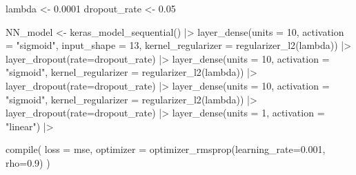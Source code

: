 \documentclass[
]{article}
\newenvironment{Shaded}{\begin{snugshade}}{\end{snugshade}}
\newcommand{\AttributeTok}[1]{\textcolor[rgb]{0.77,0.63,0.00}{#1}}
\newcommand{\DecValTok}[1]{\textcolor[rgb]{0.00,0.00,0.81}{#1}}
\newcommand{\FloatTok}[1]{\textcolor[rgb]{0.00,0.00,0.81}{#1}}
\newcommand{\FunctionTok}[1]{\textcolor[rgb]{0.00,0.00,0.00}{#1}}
\newcommand{\NormalTok}[1]{#1}
\newcommand{\OtherTok}[1]{\textcolor[rgb]{0.56,0.35,0.01}{#1}}
\newcommand{\SpecialCharTok}[1]{\textcolor[rgb]{0.00,0.00,0.00}{#1}}
\newcommand{\StringTok}[1]{\textcolor[rgb]{0.31,0.60,0.02}{#1}}
\begin{document}
\begin{Shaded}
\begin{Highlighting}[]
\NormalTok{lambda }\OtherTok{\textless{}{-}} \FloatTok{0.0001}
\NormalTok{dropout\_rate }\OtherTok{\textless{}{-}} \FloatTok{0.05}

\NormalTok{NN\_model }\OtherTok{\textless{}{-}} \FunctionTok{keras\_model\_sequential}\NormalTok{() }\SpecialCharTok{|\textgreater{}}
    \FunctionTok{layer\_dense}\NormalTok{(}\AttributeTok{units =} \DecValTok{10}\NormalTok{, }\AttributeTok{activation =} \StringTok{"sigmoid"}\NormalTok{, }\AttributeTok{input\_shape =} \DecValTok{13}\NormalTok{, }\AttributeTok{kernel\_regularizer =} \FunctionTok{regularizer\_l2}\NormalTok{(lambda)) }\SpecialCharTok{|\textgreater{}}
    \FunctionTok{layer\_dropout}\NormalTok{(}\AttributeTok{rate=}\NormalTok{dropout\_rate) }\SpecialCharTok{|\textgreater{}}
    \FunctionTok{layer\_dense}\NormalTok{(}\AttributeTok{units =} \DecValTok{10}\NormalTok{, }\AttributeTok{activation =} \StringTok{"sigmoid"}\NormalTok{, }\AttributeTok{kernel\_regularizer =} \FunctionTok{regularizer\_l2}\NormalTok{(lambda)) }\SpecialCharTok{|\textgreater{}}
    \FunctionTok{layer\_dropout}\NormalTok{(}\AttributeTok{rate=}\NormalTok{dropout\_rate) }\SpecialCharTok{|\textgreater{}}
    \FunctionTok{layer\_dense}\NormalTok{(}\AttributeTok{units =} \DecValTok{10}\NormalTok{, }\AttributeTok{activation =} \StringTok{"sigmoid"}\NormalTok{, }\AttributeTok{kernel\_regularizer =} \FunctionTok{regularizer\_l2}\NormalTok{(lambda)) }\SpecialCharTok{|\textgreater{}}
    \FunctionTok{layer\_dropout}\NormalTok{(}\AttributeTok{rate=}\NormalTok{dropout\_rate) }\SpecialCharTok{|\textgreater{}}
    \FunctionTok{layer\_dense}\NormalTok{(}\AttributeTok{units =} \DecValTok{1}\NormalTok{, }\AttributeTok{activation =} \StringTok{"linear"}\NormalTok{) }\SpecialCharTok{|\textgreater{}}

  \FunctionTok{compile}\NormalTok{(}
    \AttributeTok{loss =} \StringTok{\textquotesingle{}mse\textquotesingle{}}\NormalTok{,}
    \AttributeTok{optimizer =} \FunctionTok{optimizer\_rmsprop}\NormalTok{(}\AttributeTok{learning\_rate=}\FloatTok{0.001}\NormalTok{, }\AttributeTok{rho=}\FloatTok{0.9}\NormalTok{)    }
\NormalTok{)}
\end{Highlighting}
\end{Shaded}
\end{document}
